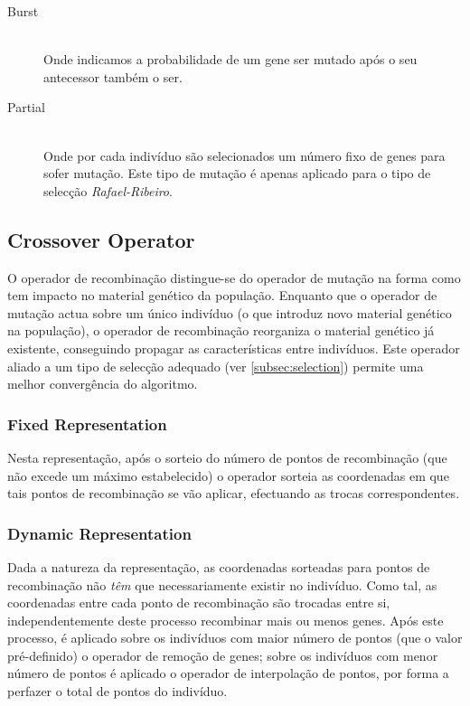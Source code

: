 \documentclass[a4paper]{article}
\begin{document}
\begin{description}
	\item[Burst] \hfill \\ 
		Onde indicamos a probabilidade de um gene ser mutado após o seu antecessor também o ser.

	\item[Partial] \hfill \\
		\label{it:partial_mutation}
		Onde por cada indivíduo são selecionados um número fixo de genes para sofer mutação.
		Este tipo de mutação é apenas aplicado para o tipo de selecção \emph{Rafael-Ribeiro}.
\end{description}
 
\cleardoublepage
\subsection{Crossover Operator}
\indent \indent O operador de recombinação distingue-se do operador de mutação na forma como tem impacto no material genético da população.
Enquanto que o operador de mutação actua sobre um único indivíduo (o que introduz novo material genético na população),
o operador de recombinação reorganiza o material genético já existente, conseguindo propagar as características entre indivíduos.
Este operador aliado a um tipo de selecção adequado (ver \ref{subsec:selection}) permite uma melhor convergência
do algoritmo.

\subsubsection{Fixed Representation}
\indent \indent Nesta representação, após o sorteio do número de pontos de recombinação (que não excede um máximo estabelecido) o operador
sorteia as coordenadas em que tais pontos de recombinação se vão aplicar, efectuando as trocas correspondentes.

\subsubsection{Dynamic Representation}
\indent \indent Dada a natureza da representação, as coordenadas sorteadas para pontos de recombinação não \emph{têm} que necessariamente existir no indivíduo.
Como tal, as coordenadas entre cada ponto de recombinação são trocadas entre si, independentemente deste processo recombinar mais ou menos genes.
Após este processo, é aplicado sobre os indivíduos com maior número de pontos (que o valor pré-definido) o operador de remoção de genes; sobre os indivíduos com menor
número de pontos é aplicado o operador de interpolação de pontos, por forma a perfazer o total de pontos do indivíduo.
\end{document}
